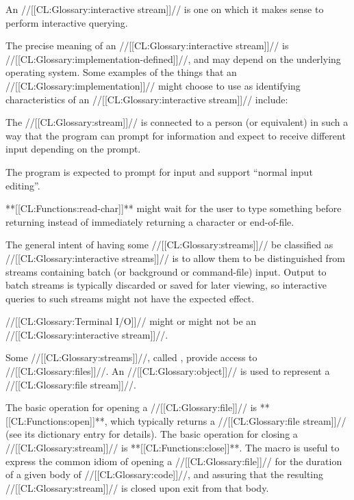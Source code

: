 \endsubsubsubsection%

 

An //[[CL:Glossary:interactive stream]]// is one on which it makes sense to perform interactive querying.

The precise meaning of an //[[CL:Glossary:interactive stream]]// is //[[CL:Glossary:implementation-defined]]//, and may depend on the underlying operating system.  Some examples of the things that an //[[CL:Glossary:implementation]]// might choose to use as identifying characteristics of an //[[CL:Glossary:interactive stream]]// include:

\beginlist

\itemitem{\bull} 
  The //[[CL:Glossary:stream]]// is connected to a person (or equivalent) in such a way
  that the program can prompt for information and expect to receive different
  input depending on the prompt.

\itemitem{\bull}
  The program is expected to prompt for input and support ``normal input editing''.

\itemitem{\bull} 
  **[[CL:Functions:read-char]]** might wait for the user to type something before returning
  instead of immediately returning a character or end-of-file. 

\endlist 

The general intent of having some //[[CL:Glossary:streams]]// be classified as //[[CL:Glossary:interactive streams]]// is to allow them to be distinguished from streams containing batch (or background or command-file) input. Output to batch streams is typically discarded or saved for later viewing,  so interactive queries to such streams might not have the expected effect.

//[[CL:Glossary:Terminal I/O]]// might or might not be an //[[CL:Glossary:interactive stream]]//.

\endsubsubsubsection%



Some //[[CL:Glossary:streams]]//, called , provide access to //[[CL:Glossary:files]]//. An //[[CL:Glossary:object]]//  is used to represent a //[[CL:Glossary:file stream]]//.

The basic operation for opening a //[[CL:Glossary:file]]// is **[[CL:Functions:open]]**, which typically returns a //[[CL:Glossary:file stream]]//  (see its dictionary entry for details). The basic operation for closing a //[[CL:Glossary:stream]]// is **[[CL:Functions:close]]**. The macro  is useful  to express the common idiom of opening a //[[CL:Glossary:file]]//  for the duration of a given body of //[[CL:Glossary:code]]//,  and assuring that the resulting //[[CL:Glossary:stream]]// is closed upon exit from that body.

